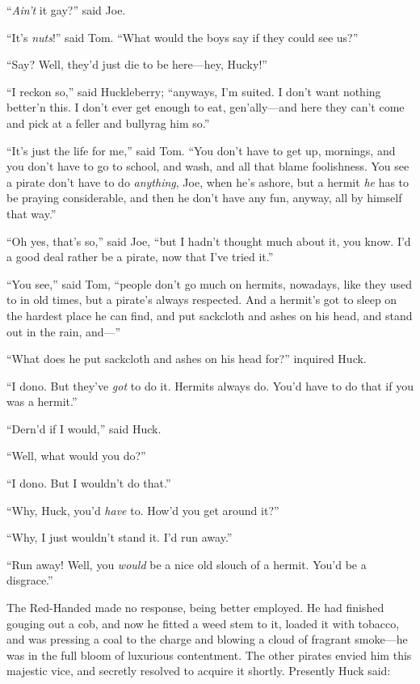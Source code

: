 \documentclass{book}
\begin{document}
“\emph{Ain’t} it gay?” said Joe.

“It’s \emph{nuts}!” said Tom. “What would the boys say if they could see us?”

“Say? Well, they’d just die to be here—hey, Hucky!”

“I reckon so,” said Huckleberry; “anyways, I’m suited. I don’t want nothing better’n this. I don’t ever get enough to eat, gen’ally—and here they can’t come and pick at a feller and bullyrag him so.”

“It’s just the life for me,” said Tom. “You don’t have to get up, mornings, and you don’t have to go to school, and wash, and all that blame foolishness. You see a pirate don’t have to do \emph{anything}, Joe, when he’s ashore, but a hermit \emph{he} has to be praying considerable, and then he don’t have any fun, anyway, all by himself that way.”

“Oh yes, that’s so,” said Joe, “but I hadn’t thought much about it, you know. I’d a good deal rather be a pirate, now that I’ve tried it.”

“You see,” said Tom, “people don’t go much on hermits, nowadays, like they used to in old times, but a pirate’s always respected. And a hermit’s got to sleep on the hardest place he can find, and put sackcloth and ashes on his head, and stand out in the rain, and—”

“What does he put sackcloth and ashes on his head for?” inquired Huck.

“I dono. But they’ve \emph{got} to do it. Hermits always do. You’d have to do that if you was a hermit.”

“Dern’d if I would,” said Huck.

“Well, what would you do?”

“I dono. But I wouldn’t do that.”

“Why, Huck, you’d \emph{have} to. How’d you get around it?”

“Why, I just wouldn’t stand it. I’d run away.”

“Run away! Well, you \emph{would} be a nice old slouch of a hermit. You’d be a disgrace.”

The Red-Handed made no response, being better employed. He had finished gouging out a cob, and now he fitted a weed stem to it, loaded it with tobacco, and was pressing a coal to the charge and blowing a cloud of fragrant smoke—he was in the full bloom of luxurious contentment. The other pirates envied him this majestic vice, and secretly resolved to acquire it shortly. Presently Huck said:
\end{document}
